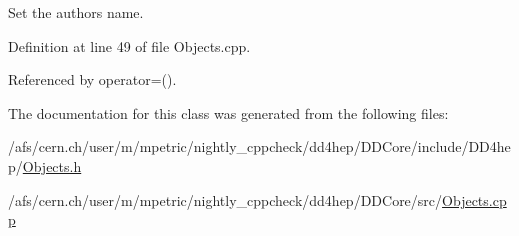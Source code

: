 Set the author\textquotesingle{}s name. 



Definition at line 49 of file Objects.\+cpp.



Referenced by operator=().



The documentation for this class was generated from the following files\+:\begin{DoxyCompactItemize}
\item 
/afs/cern.\+ch/user/m/mpetric/nightly\+\_\+cppcheck/dd4hep/\+D\+D\+Core/include/\+D\+D4hep/\hyperlink{_objects_8h}{Objects.\+h}\item 
/afs/cern.\+ch/user/m/mpetric/nightly\+\_\+cppcheck/dd4hep/\+D\+D\+Core/src/\hyperlink{_objects_8cpp}{Objects.\+cpp}\end{DoxyCompactItemize}
